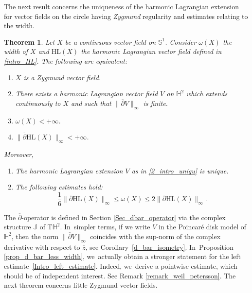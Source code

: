 \documentclass[11pt]{article}
\newenvironment{enumeratei}
{\bgroup\def\theenumi{\roman{enumi}}\def\theenumii{\arabic{enumii}}\begin{enumerate}}
{\end{enumerate}\egroup}
\theoremstyle{plain}
\newtheorem{theorem}[cor]{Theorem}
\theoremstyle{definition}
\begin{document}
The next result concerns the uniqueness of the harmonic Lagrangian extension for vector fields on the circle having \emph{Zygmund} regularity and estimates relating to the width.
\begin{theorem}\label{intro_uniqu_HL}
Let $X$ be a continuous vector field on $\mathbb{S}^1$. Consider $\omega(X)$ the width of $X$ and $\mathrm{HL}(X)$ the harmonic Lagrangian vector field defined in \eqref{intro_HL}. The following are equivalent:
\begin{enumerate}
\item \label{1_intro_uniqu} $X$ is a Zygmund vector field.
\item \label{2_intro_uniqu} There exists a harmonic Lagrangian vector field $V$ on $\mathbb{H}^2$ which extends continuously to $X$ and such that $\lVert\overline{\partial} V \rVert_{\infty}$ is finite.
\item \label{3_intro_uniqu} $\omega(X)<+\infty$.
\item \label{4_intro_uniqu} $\lVert \overline{\partial}\mathrm{HL}(X)\rVert_{\infty}<+\infty$.
\end{enumerate}
Moreover,
\begin{enumeratei}
\item\label{Moreover_i} The harmonic Lagrangian extension $V$ as in \eqref{2_intro_uniqu} is unique.
\item\label{Moreover_ii} The following estimates hold:
\begin{equation}\label{Intro_left_estimate}
\frac{1}{6}\lVert \overline{\partial} \mathrm{HL}(X)\rVert_{\infty} \leq \omega(X) \leq 2\lVert \overline{\partial} \mathrm{HL}(X) \rVert_{\infty}.
\end{equation}
\end{enumeratei}
\end{theorem}
The \(\overline{\partial}\)-operator is defined in Section \ref{Sec_dbar_operator} via the complex structure \(\mathbb{J}\) of \(\mathrm{T}\mathbb{H}^2\). In~simpler terms, if we write \(V\) in the Poincaré disk model of \(\mathbb{H}^2\), then the norm \(\lVert\overline{\partial} V \rVert_{\infty}\) coincides with the sup-norm of the complex derivative with respect to \(\overline{z}\), see Corollary~\ref{d_bar_isometry}. In~Proposition \ref{prop_d_bar_less_width}, we~actually obtain a stronger statement for the left estimate~\eqref{Intro_left_estimate}. Indeed, we~derive a pointwise estimate, which should be of independent interest. See Remark \ref{remark_weil_petersson}. The next theorem concerns little Zygmund vector fields.
\end{document}
